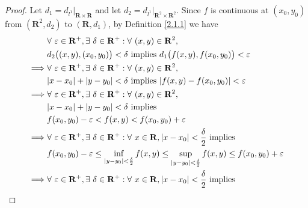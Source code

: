 \begin{proof}
    Let \(d_1 = d_{l^1}|_{\mathbf{R} \times \mathbf{R}}\) and let \(d_2 = d_{l^1}|_{\mathbf{R}^2 \times \mathbf{R}^2}\).
    Since \(f\) is continuous at \((x_0, y_0)\) from \((\mathbf{R}^2, d_2)\) to \((\mathbf{R}, d_1)\), by Definition \ref{2.1.1} we have
    \begin{align*}
                 & \forall\ \varepsilon \in \mathbf{R}^+, \exists\ \delta \in \mathbf{R}^+ : \forall\ (x, y) \in \mathbf{R}^2,                                                          \\
                 & d_2\big((x, y), (x_0, y_0)\big) < \delta \text{ implies } d_1\big(f(x, y), f(x_0, y_0)\big) < \varepsilon                                                            \\
        \implies & \forall\ \varepsilon \in \mathbf{R}^+, \exists\ \delta \in \mathbf{R}^+ : \forall\ (x, y) \in \mathbf{R}^2,                                                          \\
                 & \abs*{x - x_0} + \abs*{y - y_0} < \delta \text{ implies } \abs*{f(x, y) - f(x_0, y_0)} < \varepsilon                                                                 \\
        \implies & \forall\ \varepsilon \in \mathbf{R}^+, \exists\ \delta \in \mathbf{R}^+ : \forall\ (x, y) \in \mathbf{R}^2,                                                          \\
                 & \abs*{x - x_0} + \abs*{y - y_0} < \delta \text{ implies}                                                                                                             \\
                 & f(x_0, y_0) - \varepsilon < f(x, y) < f(x_0, y_0) + \varepsilon                                                                                                      \\
        \implies & \forall\ \varepsilon \in \mathbf{R}^+, \exists\ \delta \in \mathbf{R}^+ : \forall\ x \in \mathbf{R}, \abs*{x - x_0} < \frac{\delta}{2} \text{ implies}               \\
                 & f(x_0, y_0) - \varepsilon \leq \inf_{\abs*{y - y_0} < \frac{\delta}{2}} f(x, y) \leq \sup_{\abs*{y - y_0} < \frac{\delta}{2}} f(x, y) \leq f(x_0, y_0) + \varepsilon \\
        \implies & \forall\ \varepsilon \in \mathbf{R}^+, \exists\ \delta \in \mathbf{R}^+ : \forall\ x \in \mathbf{R}, \abs*{x - x_0} < \frac{\delta}{2} \text{ implies}               \\

\end{align*}
\end{proof}
